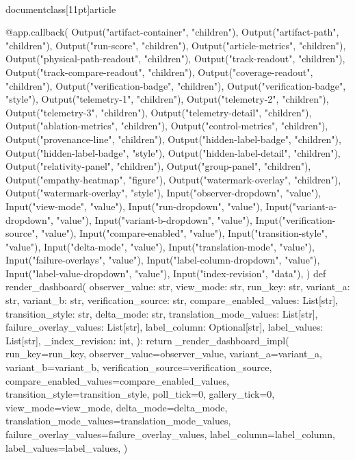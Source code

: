 \\documentclass[11pt]{article}
\begin{document}
\begin{CodeBlock}
{{{{{{{{@app.callback(
    Output("artifact-container", "children"),
    Output("artifact-path", "children"),
    Output("run-score", "children"),
    Output("article-metrics", "children"),
    Output("physical-path-readout", "children"),
    Output("track-readout", "children"),
    Output("track-compare-readout", "children"),
    Output("coverage-readout", "children"),
    Output("verification-badge", "children"),
    Output("verification-badge", "style"),
    Output("telemetry-1", "children"),
    Output("telemetry-2", "children"),
    Output("telemetry-3", "children"),
    Output("telemetry-detail", "children"),
    Output("ablation-metrics", "children"),
    Output("control-metrics", "children"),
    Output("provenance-line", "children"),
    Output("hidden-label-badge", "children"),
    Output("hidden-label-badge", "style"),
    Output("hidden-label-detail", "children"),
    Output("relativity-panel", "children"),
    Output("group-panel", "children"),
    Output("empathy-heatmap", "figure"),
    Output("watermark-overlay", "children"),
    Output("watermark-overlay", "style"),
    Input("observer-dropdown", "value"),
    Input("view-mode", "value"),
    Input("run-dropdown", "value"),
    Input("variant-a-dropdown", "value"),
    Input("variant-b-dropdown", "value"),
    Input("verification-source", "value"),
    Input("compare-enabled", "value"),
    Input("transition-style", "value"),
    Input("delta-mode", "value"),
    Input("translation-mode", "value"),
    Input("failure-overlays", "value"),
    Input("label-column-dropdown", "value"),
    Input("label-value-dropdown", "value"),
    Input("index-revision", "data"),
)
def render_dashboard(
    observer_value: str,
    view_mode: str,
    run_key: str,
    variant_a: str,
    variant_b: str,
    verification_source: str,
    compare_enabled_values: List[str],
    transition_style: str,
    delta_mode: str,
    translation_mode_values: List[str],
    failure_overlay_values: List[str],
    label_column: Optional[str],
    label_values: List[str],
    _index_revision: int,
):
    return _render_dashboard_impl(
        run_key=run_key,
        observer_value=observer_value,
        variant_a=variant_a,
        variant_b=variant_b,
        verification_source=verification_source,
        compare_enabled_values=compare_enabled_values,
        transition_style=transition_style,
        poll_tick=0,
        gallery_tick=0,
        view_mode=view_mode,
        delta_mode=delta_mode,
        translation_mode_values=translation_mode_values,
        failure_overlay_values=failure_overlay_values,
        label_column=label_column,
        label_values=label_values,
    )


}}}}}}}}
\end{CodeBlock}
\end{document}
